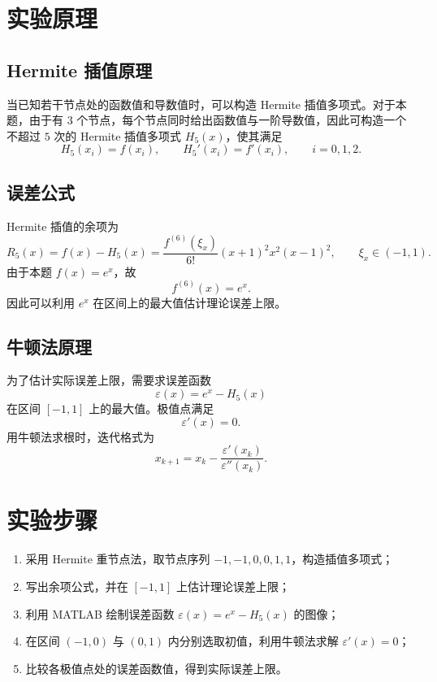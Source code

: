 \documentclass[12pt,a4paper]{ctexart}
\begin{document}
\section{实验原理}

\subsection{Hermite 插值原理}

当已知若干节点处的函数值和导数值时，可以构造 Hermite 插值多项式。对于本题，由于有 $3$ 个节点，每个节点同时给出函数值与一阶导数值，因此可构造一个不超过 $5$ 次的 Hermite 插值多项式 $H_5(x)$，使其满足
\[
H_5(x_i)=f(x_i),\qquad H_5'(x_i)=f'(x_i),\qquad i=0,1,2.
\]

\subsection{误差公式}

Hermite 插值的余项为
\[
R_5(x)=f(x)-H_5(x)=\frac{f^{(6)}(\xi_x)}{6!}(x+1)^2x^2(x-1)^2,\qquad \xi_x\in(-1,1).
\]
由于本题 $f(x)=e^x$，故
\[
f^{(6)}(x)=e^x.
\]
因此可以利用 $e^x$ 在区间上的最大值估计理论误差上限。

\subsection{牛顿法原理}

为了估计实际误差上限，需要求误差函数
\[
\varepsilon(x)=e^x-H_5(x)
\]
在区间 $[-1,1]$ 上的最大值。极值点满足
\[
\varepsilon'(x)=0.
\]
用牛顿法求根时，迭代格式为
\[
x_{k+1}=x_k-\frac{\varepsilon'(x_k)}{\varepsilon''(x_k)}.
\]

\section{实验步骤}

\begin{enumerate}
    \item 采用 Hermite 重节点法，取节点序列 $-1,-1,0,0,1,1$，构造插值多项式；
    \item 写出余项公式，并在 $[-1,1]$ 上估计理论误差上限；
    \item 利用 MATLAB 绘制误差函数 $\varepsilon(x)=e^x-H_5(x)$ 的图像；
    \item 在区间 $(-1,0)$ 与 $(0,1)$ 内分别选取初值，利用牛顿法求解 $\varepsilon'(x)=0$；
    \item 比较各极值点处的误差函数值，得到实际误差上限。
\end{enumerate}
\end{document}
